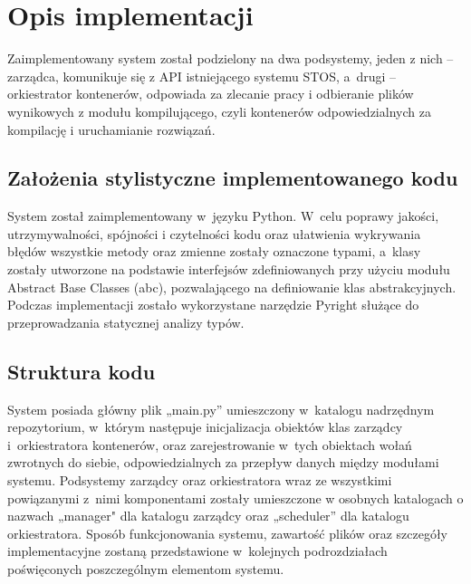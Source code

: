 \section{Opis implementacji}
Zaimplementowany system został podzielony na dwa podsystemy, jeden z nich -- zarządca, komunikuje się z API istniejącego systemu STOS, a~drugi -- orkiestrator kontenerów, odpowiada za zlecanie pracy i odbieranie plików wynikowych z modułu kompilującego, czyli kontenerów odpowiedzialnych za kompilację i uruchamianie rozwiązań.

\subsection{Założenia stylistyczne implementowanego kodu}
System został zaimplementowany w~języku Python. W~celu poprawy jakości, utrzymywalności, spójności i czytelności kodu oraz ułatwienia wykrywania błędów wszystkie metody oraz zmienne zostały oznaczone typami, a~klasy zostały utworzone na podstawie interfejsów zdefiniowanych przy użyciu modułu Abstract Base Classes (abc)\cite{pythonAbc}, pozwalającego na definiowanie klas abstrakcyjnych. Podczas implementacji zostało wykorzystane narzędzie Pyright służące do przeprowadzania statycznej analizy typów.

\subsection{Struktura kodu}
System posiada główny plik „main.py” umieszczony w~katalogu nadrzędnym repozytorium, w~którym następuje inicjalizacja obiektów klas zarządcy i~orkiestratora kontenerów, oraz zarejestrowanie w~tych obiektach wołań zwrotnych do siebie, odpowiedzialnych za przepływ danych między modułami systemu. Podsystemy zarządcy oraz orkiestratora wraz ze wszystkimi powiązanymi z~nimi komponentami zostały umieszczone w osobnych katalogach o nazwach „manager" dla katalogu zarządcy oraz „scheduler” dla katalogu orkiestratora.
Sposób funkcjonowania systemu, zawartość plików oraz szczegóły implementacyjne zostaną przedstawione w~kolejnych podrozdziałach poświęconych poszczególnym elementom systemu. 
